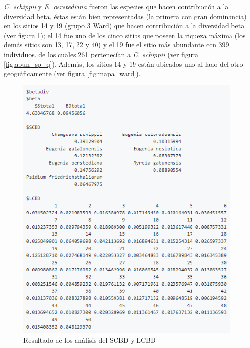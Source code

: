 \documentclass[11pt,]{article}
\begin{document}
\emph{C. schippii} y \emph{E. oerstediana} fueron las especies que hacen
contribución a la diversidad beta, éstas están bien representadas (la
primera con gran dominancia) en los sitios 14 y 19 (grupo 3 Ward) que
hacen contribución a la diversidad beta (ver figura \ref{fig:beta_div});
el 14 fue uno de los cinco sitios que poseen la riqueza máxima (los
demás sitios son 13, 17, 22 y 40) y el 19 fue el sitio más abundante con
399 individuos, de los cuales 261 pertenecían a \emph{C. schippii} (ver
figura \ref{fig:abun_sp_q}). Además, los sitios 14 y 19 están ubicados
uno al lado del otro geográficamente (ver figura \ref{fig:mapa_ward}).

\begin{figure}
\centering
\includegraphics{beta_div.png}
\caption{Resultado de los análisis del SCBD y LCBD\label{fig:beta_div}}
\end{figure}
\end{document}
